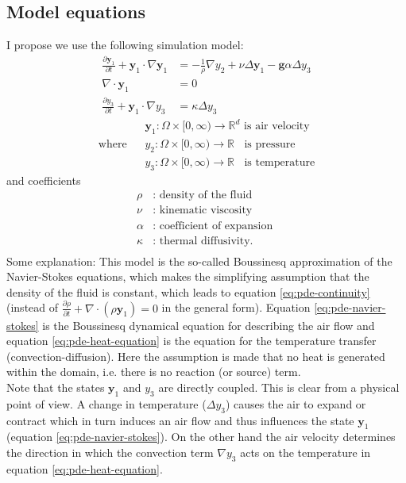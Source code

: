 \documentclass[
12pt,
a4paper,
onecolumn,
portrait
]{article}
\begin{document}
\subsection{Model equations}
I propose we use the following simulation model:
\begin{align}
\frac{\partial \mathbf{y}_1}{\partial t} + \mathbf{y}_1 \cdot \nabla \mathbf{y}_1 &= - \frac{1}{\rho} \nabla y_2 + \nu \Delta \mathbf{y}_1 - \textbf{g} \alpha \Delta y_3 \label{eq:pde-navier-stokes}\\
\nabla \cdot \mathbf{y}_1 &= 0 \label{eq:pde-continuity}\\
\frac{\partial y_3}{\partial t} + \mathbf{y}_1 \cdot \nabla y_3 &= \kappa \Delta y_3 \label{eq:pde-heat-equation}
\end{align}
\begin{align*}
& \mathbf{y}_1: \Omega \times [0, \infty) \rightarrow \mathbb{R}^{d} \text{ is air velocity}  \\
\text{where}\;\;\; &y_2: \Omega \times [0, \infty) \rightarrow \mathbb{R} \;\; \text{ is pressure} \\
&y_3: \Omega \times [0, \infty) \rightarrow \mathbb{R} \;\; \text{ is temperature}
\end{align*}
and coefficients 
\begin{align*}
\rho &: \text{ density of the fluid } \\
\nu  &: \text{ kinematic viscosity } \\
\alpha &: \text{ coefficient of expansion } \\
\kappa &: \text{ thermal diffusivity. } \\
\end{align*}
Some explanation: This model is the so-called Boussinesq approximation of the Navier-Stokes equations, which makes the simplifying assumption that the density of the fluid is constant, which leads to equation \eqref{eq:pde-continuity} (instead of $\frac{\partial \rho}{\partial t} + \nabla \cdot (\rho \mathbf{y}_1) = 0$ in the general form). Equation \eqref{eq:pde-navier-stokes} is the Boussinesq dynamical equation for describing the air flow and equation \eqref{eq:pde-heat-equation} is the equation for the temperature transfer (convection-diffusion). Here the assumption is made that no heat is generated within the domain, i.e. there is no reaction (or source) term.\\
Note that the states $\mathbf{y}_1$ and $y_3$ are directly coupled. This is clear from a physical point of view. A change in temperature ($\Delta y_3$) causes the air to expand or contract which in turn induces an air flow and thus influences the state $\mathbf{y}_1$ (equation \eqref{eq:pde-navier-stokes}). On the other hand the air velocity determines the direction in which the convection term $\nabla y_3$ acts on the temperature in equation \eqref{eq:pde-heat-equation}.
\end{document}
